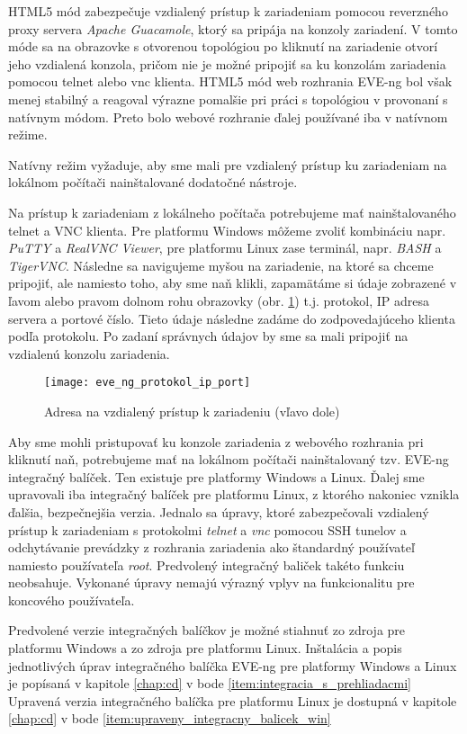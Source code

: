 \begin{enumerate}[noitemsep]
    HTML5 mód zabezpečuje vzdialený prístup k zariadeniam pomocou reverzného proxy servera \emph{Apache Guacamole}, ktorý sa pripája na konzoly zariadení. V tomto móde sa na obrazovke s otvorenou topológiou po kliknutí na zariadenie otvorí jeho vzdialená konzola, pričom nie je možné pripojiť sa ku konzolám zariadenia pomocou telnet alebo vnc klienta. HTML5 mód web rozhrania EVE-ng bol však menej stabilný a reagoval výrazne pomalšie pri práci s topológiou v provonaní s natívnym módom. Preto bolo webové rozhranie ďalej používané iba v natívnom režime.
        
    Natívny režim vyžaduje, aby sme mali pre vzdialený prístup ku zariadeniam na lokálnom počítači nainštalované dodatočné nástroje. 
        
    Na prístup k zariadeniam z lokálneho počítača potrebujeme mať nainštalovaného telnet a VNC klienta. Pre platformu Windows môžeme zvoliť kombináciu napr. \emph{PuTTY} a \emph{RealVNC Viewer}, pre platformu Linux zase terminál, napr. \emph{BASH} a \emph{TigerVNC}. Následne sa navigujeme myšou na zariadenie, na ktoré sa chceme pripojiť, ale namiesto toho, aby sme naň klikli, zapamätáme si údaje zobrazené v ľavom alebo pravom dolnom rohu obrazovky (obr. \ref{obr:eve_ng_protokol_ip_port}) t.j. protokol, IP adresa servera a portové číslo. Tieto údaje následne zadáme do zodpovedajúceho klienta podľa protokolu. Po zadaní správnych údajov by sme sa mali pripojiť na vzdialenú konzolu zariadenia.

\begin{figure}
    \centering
    \texttt{[image: eve\_ng\_protokol\_ip\_port]}
    \caption{Adresa na vzdialený prístup k zariadeniu (vľavo dole)}
    \label{obr:eve_ng_protokol_ip_port}
\end{figure}

    Aby sme mohli pristupovať ku konzole zariadenia z webového rozhrania pri kliknutí naň, potrebujeme mať na lokálnom počítači nainštalovaný tzv. EVE-ng integračný balíček. Ten existuje pre platformy Windows a Linux. Ďalej sme upravovali iba integračný balíček pre platformu Linux, z ktorého nakoniec vznikla ďalšia, bezpečnejšia verzia. Jednalo sa úpravy, ktoré zabezpečovali vzdialený prístup k zariadeniam s protokolmi \emph{telnet} a \emph{vnc} pomocou SSH tunelov a odchytávanie prevádzky z rozhrania zariadenia ako štandardný používateľ namiesto používateľa \emph{root}. Predvolený integračný baliček takéto funkciu neobsahuje. Vykonané úpravy nemajú výrazný vplyv na funkcionalitu pre koncového používateľa.
    
    Predvolené verzie integračných balíčkov je možné stiahnuť zo zdroja \cite{eve_ng_integration_pack_win} pre platformu Windows a zo zdroja \cite{eve_ng_integration_pack_linux} pre platformu Linux. Inštalácia a popis jednotlivých úprav integračného balíčka EVE-ng pre platformy Windows a Linux je popísaná v kapitole \ref{chap:cd} v bode \ref{item:integracia_s_prehliadacmi} Upravená verzia integračného balíčka pre platformu Linux je dostupná v kapitole \ref{chap:cd} v bode \ref{item:upraveny_integracny_balicek_win}

\end{enumerate}

